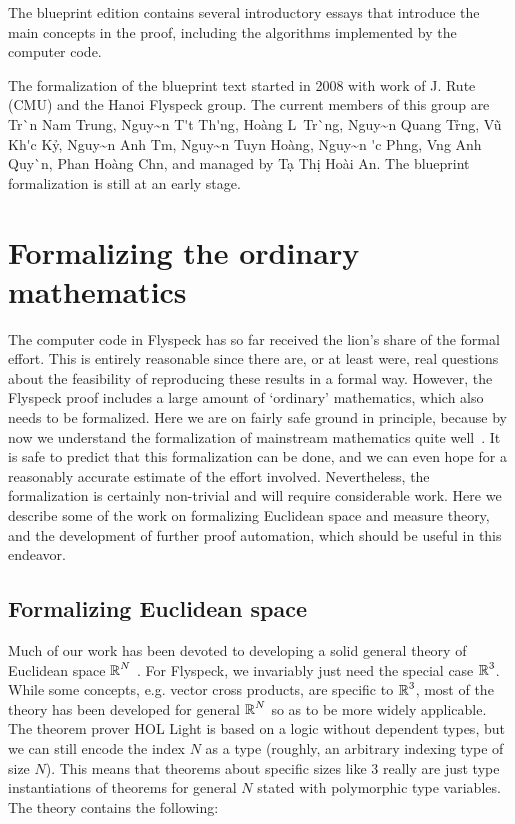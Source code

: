 \documentclass[11pt]{amsart}
\def\vn{\fontencoding{T5}\selectfont}
\newcommand{\real}{\mbox{$\protect\mathbb R$}}
\begin{document}
The blueprint edition contains several introductory essays that introduce 
the main concepts in the proof, including the algorithms implemented by the computer code.

The formalization of the blueprint text started in
2008 with work of J. Rute (CMU) and the Hanoi Flyspeck group. The current members of this group are {\vn Tr\`\acircumflex n Nam Trung}, {\vn Nguy\~\ecircumflex n T\'\acircumflex t Th\'\abreve ng}, {\vn Ho\`ang L\ecircumflex\ Tr\uhorn\`\ohorn ng}, {\vn Nguy\~\ecircumflex n Quang Tr\uhorn\h\ohorn ng}, {\vn V\~u Kh\'\abreve c K\h y}, {\vn Nguy\~\ecircumflex n Anh T\acircumflex m}, {\vn Nguy\~\ecircumflex n Tuy\ecircumflex n Ho\`ang}, {\vn Nguy\~\ecircumflex n \DJ\'\uhorn c Ph\uhorn \ohorn ng}, {\vn V\uhorn \ohorn ng Anh Quy\`\ecircumflex n}, {\vn Phan Ho\`ang Ch\ohorn n}, and managed by {\vn T\d a Th\d i Ho\`ai An}.  The blueprint formalization is still at an early stage.


\section{Formalizing the ordinary mathematics}
\label{sec:ordinary}

The computer code in Flyspeck has so far received the lion's share of the
formal effort. This is entirely reasonable since there are, or at least were,
real questions about the feasibility of reproducing these results in a formal
way. However, the Flyspeck proof includes a large amount of `ordinary'
mathematics, which also needs to be formalized. Here we are on fairly safe
ground in principle, because by now we understand the formalization of
mainstream mathematics quite well~\cite{wiedijk-17}. It is safe to predict that
this formalization can be done, and we can even hope for a reasonably accurate
estimate of the effort involved. Nevertheless, the formalization is certainly
non-trivial and will require considerable work. Here we describe some of the
work on formalizing Euclidean space and measure theory, and the development of
further proof automation, which should be useful in this endeavor.

\subsection*{Formalizing Euclidean space}

Much of our work has been devoted to developing a solid general theory of
Euclidean space $\real^N$ \cite{harrison-euclidean}. For Flyspeck, we
invariably just need the special case $\real^3$. While some concepts, e.g.
vector cross products, are specific to $\real^3$, most of the theory has been
developed for general $\real^N$ so as to be more widely applicable. The theorem
prover HOL Light \cite{harrison-demo} is based on a logic without dependent
types, but we can still encode the index $N$ as a type (roughly, an arbitrary
indexing type of size $N$). This means that theorems about specific sizes like
$3$ really are just type instantiations of theorems for general $N$ stated with
polymorphic type variables. The theory contains the following:
\end{document}
